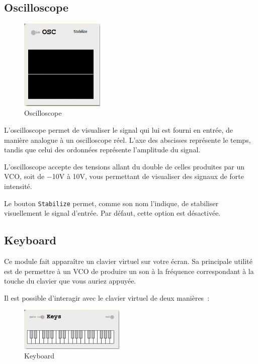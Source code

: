 \documentclass[a4paper,oneside,frenchb,10pt]{article}
\begin{document}
\subsection{Oscilloscope}

\begin{multicols}{2}
\begin{figure}[H]
\centering
\includegraphics[width=4cm]{../img/png/oscilloscope.png}
\caption{Oscilloscope}
\end{figure}

L'oscilloscope permet de visualiser le signal qui lui est fourni en
entrée, de manière analogue à un oscilloscope réel. L'axe des abscisses
représente le temps, tandis que celui des ordonnées représente
l'amplitude du signal.

L'oscilloscope accepte des tensions allant du double de celles produites
par un VCO, soit de −10V à 10V, vous permettant de visualiser des
signaux de forte intensité.

Le bouton \verb!Stabilize! permet, comme son nom l'indique, de
stabiliser visuellement le signal d'entrée. Par défaut, cette option est
désactivée.
\end{multicols}

\subsection{Keyboard}

\begin{multicols}{2}
Ce module fait apparaître un clavier virtuel sur votre écran. Sa
principale utilité est de permettre à un VCO de produire un son à la
fréquence correspondant à la touche du clavier que vous auriez appuyée.

Il est possible d'interagir avec le clavier virtuel de deux manières~:

\begin{figure}[H]
\centering
\includegraphics[width=5cm]{../img/png/keyboard.png}
\caption{Keyboard}
\end{figure}
\end{multicols}
\end{document}
